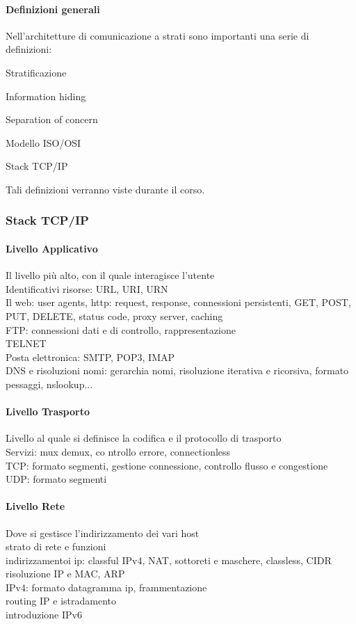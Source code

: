 \documentclass[10pt]{article}
\begin{document}
\paragraph{Definizioni generali} Nell'architetture di comunicazione a strati sono importanti una serie di definizioni:
\begin{list}{-}{}
\item Stratificazione
\item Information hiding
\item Separation of concern
\item Modello ISO/OSI
\item Stack TCP/IP
\end{list}
Tali definizioni verranno viste durante il corso.

\subsubsection{Stack TCP/IP}
\paragraph{Livello Applicativo} Il livello più alto, con il quale interagisce l'utente\\
Identificativi risorse: URL, URI, URN\\
Il web: user agents, http: request, response, connessioni persistenti, GET, POST, PUT, DELETE, status code, proxy server, caching\\
FTP: connessioni dati e di controllo, rappresentazione\\
TELNET\\
Posta elettronica: SMTP, POP3, IMAP\\
DNS e risoluzioni nomi: gerarchia nomi, risoluzione iterativa e ricorsiva, formato pessaggi, nslookup...\\
\paragraph{Livello Trasporto} Livello al quale si definisce la codifica e il protocollo di trasporto\\
Servizi: mux demux, co ntrollo errore, connectionless\\
TCP: formato segmenti, gestione connessione, controllo flusso e congestione\\
UDP: formato segmenti\\
\paragraph{Livello Rete} Dove si gestisce l'indirizzamento dei vari host\\
strato di rete e funzioni\\
indirizzamentoi ip: classful IPv4, NAT, sottoreti e maschere, classless, CIDR\\
risoluzione IP e MAC, ARP\\
IPv4: formato datagramma ip, frammentazione\\
routing IP e istradamento\\
introduzione IPv6\\
\end{document}

